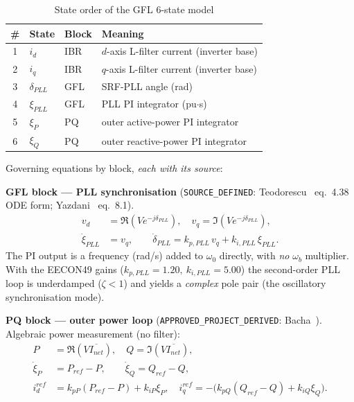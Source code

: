 \documentclass[12pt,a4paper]{article}
\begin{document}
\begin{table}[H]\centering\small
\caption{State order of the GFL 6-state model}
\label{tab:order-gfl}
\begin{tabular}{clll}\toprule
\# & State & Block & Meaning\\\midrule
1 & $i_d$        & IBR & $d$-axis L-filter current (inverter base)\\
2 & $i_q$        & IBR & $q$-axis L-filter current (inverter base)\\
3 & $\delta_{PLL}$ & GFL & SRF-PLL angle (rad)\\
4 & $\xi_{PLL}$  & GFL & PLL PI integrator (pu$\cdot$s)\\
5 & $\xi_{P}$    & PQ  & outer active-power PI integrator\\
6 & $\xi_{Q}$    & PQ  & outer reactive-power PI integrator\\\bottomrule
\end{tabular}\end{table}

\noindent Governing equations by block, \emph{each with its source}:

\noindent\textbf{GFL block --- PLL synchronisation} (\texttt{SOURCE\_DEFINED}:
Teodorescu~\cite{teodorescu2011} eq.~4.38 ODE form; Yazdani~\cite{yazdani2010} eq.~8.1).
\begin{align}
v_d &= \Re(Ve^{-j\delta_{PLL}}),\quad v_q = \Im(Ve^{-j\delta_{PLL}}),\\
\dot\xi_{PLL} &= v_q,\qquad
\dot\delta_{PLL} = k_{p,PLL}\,v_q + k_{i,PLL}\,\xi_{PLL}.
\label{eq:gfl-pll}
\end{align}
The PI output is a frequency (rad/s) added to $\omega_0$ directly, with \emph{no}
$\omega_b$ multiplier. With the EECON49 gains ($k_{p,PLL}=1.20,\ k_{i,PLL}=5.00$) the
second-order PLL loop is underdamped ($\zeta<1$) and yields a \emph{complex} pole pair
(the oscillatory synchronisation mode).

\noindent\textbf{PQ block --- outer power loop} (\texttt{APPROVED\_PROJECT\_DERIVED}:
Bacha~\cite{bacha2014}). Algebraic power measurement (no filter):
\begin{align}
P &= \Re(V\overline{I_{net}}),\quad Q = \Im(V\overline{I_{net}}),\\
\dot\xi_{P} &= P_{ref}-P,\qquad \dot\xi_{Q} = Q_{ref}-Q,\\
i_d^{ref} &= k_{pP}(P_{ref}-P)+k_{iP}\xi_{P},\quad
i_q^{ref} = -\big(k_{pQ}(Q_{ref}-Q)+k_{iQ}\xi_{Q}\big).
\end{align}
\end{document}
